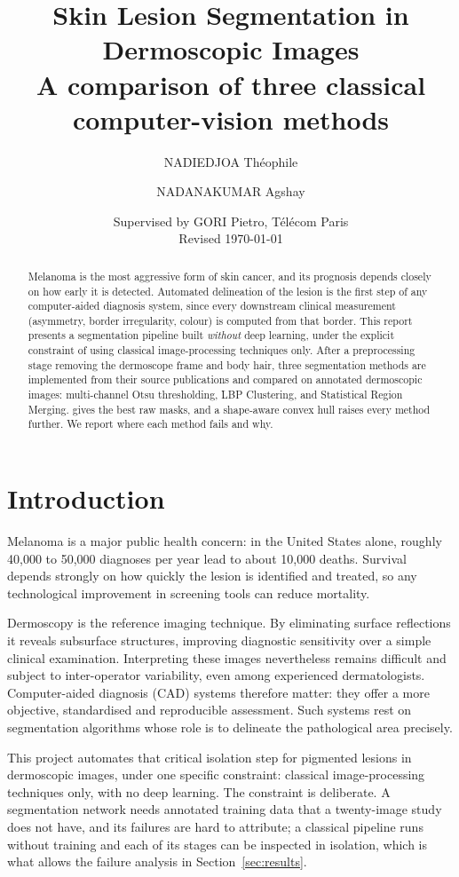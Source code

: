 \documentclass[11pt,a4paper]{article}
\title{\textbf{Skin Lesion Segmentation in Dermoscopic Images}\\[0.3em]
\large A comparison of three classical computer-vision methods}
\author{NADIEDJOA Théophile \and NADANAKUMAR Agshay}
\date{Supervised by GORI Pietro, Télécom Paris\\[0.5em]
Revised \today}
\begin{document}
\maketitle

\begin{abstract}
\noindent
Melanoma is the most aggressive form of skin cancer, and its prognosis depends
closely on how early it is detected. Automated delineation of the lesion is the
first step of any computer-aided diagnosis system, since every downstream
clinical measurement (asymmetry, border irregularity, colour) is computed
from that border. This report presents a segmentation pipeline built
\emph{without} deep learning, under the explicit constraint of using classical
image-processing techniques only. After a preprocessing stage removing the
dermoscope frame and body hair, three segmentation methods are implemented from
their source publications and compared on \nimages{} annotated dermoscopic
images: multi-channel Otsu thresholding, LBP Clustering, and Statistical Region
Merging. \bestmethod{} gives the best raw masks, and a shape-aware convex hull
raises every method further. We report where each method fails and why.
\end{abstract}

\section*{Introduction}

Melanoma is a major public health concern: in the United States alone, roughly
40{,}000 to 50{,}000 diagnoses per year lead to about 10{,}000 deaths. Survival
depends strongly on how quickly the lesion is identified and treated, so any
technological improvement in screening tools can reduce mortality.

Dermoscopy is the reference imaging technique. By eliminating surface
reflections it reveals subsurface structures, improving diagnostic sensitivity
over a simple clinical examination. Interpreting these images nevertheless
remains difficult and subject to inter-operator variability, even among
experienced dermatologists. Computer-aided diagnosis (CAD) systems therefore
matter: they offer a more objective, standardised and reproducible assessment.
Such systems rest on segmentation algorithms whose role is to delineate the
pathological area precisely.

This project automates that critical isolation step for pigmented lesions in
dermoscopic images, under one specific constraint: classical image-processing
techniques only, with no deep learning. The constraint is deliberate. A
segmentation network needs annotated training data that a twenty-image study
does not have, and its failures are hard to attribute; a classical pipeline runs
without training and each of its stages can be inspected in isolation, which is
what allows the failure analysis in Section~\ref{sec:results}.
\end{document}
